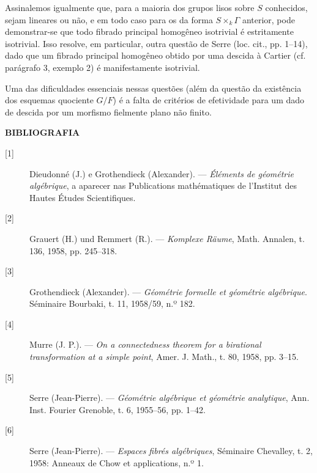 Assinalemos igualmente que, para a maioria dos grupos lisos sobre $S$ conhecidos,
sejam lineares ou não, e em todo caso para os da forma
$S\times_k\Gamma$ anterior, pode demonstrar-se que todo fibrado principal
homogêneo isotrivial é estritamente isotrivial. Isso resolve, em particular,
outra questão de Serre (loc. cit., pp. 1--14), dado que um fibrado principal
homogêneo obtido por uma descida à Cartier (cf. parágrafo 3, exemplo 2) é
manifestamente isotrivial.

 Uma das dificuldades essenciais nessas questões
(além da questão da existência dos esquemas quociente $G/F$) é a
falta de critérios de efetividade para um dado de descida por um morfismo
fielmente plano não finito.

\begin{center}
  \textbf{BIBLIOGRAFIA}
\end{center}

\begin{description}
  \item[{[1]}] Dieudonné (J.) e Grothendieck (Alexander). --- \emph{Éléments
    de géométrie algébrique}, a aparecer nas Publications
    mathématiques de l'Institut des Hautes Études Scientifiques.
  \item[{[2]}] Grauert (H.) und Remmert (R.). --- \emph{Komplexe Räume}, Math.
    Annalen, t. 136, 1958, pp. 245--318.
  \item[{[3]}] Grothendieck (Alexander). --- \emph{Géométrie formelle et
    géométrie algébrique}. Séminaire Bourbaki, t. 11, 1958/59, n.º 182.
  \item[{[4]}] Murre (J. P.). --- \emph{On a connectedness theorem for a
    birational transformation at a simple point}, Amer. J. Math., t. 80, 1958,
    pp. 3--15.
  \item[{[5]}] Serre (Jean-Pierre). --- \emph{Géométrie algébrique et géométrie
    analytique}, Ann. Inst. Fourier Grenoble, t. 6, 1955--56, pp. 1--42.
  \item[{[6]}] Serre (Jean-Pierre). --- \emph{Espaces fibrés algébriques},
    Séminaire Chevalley, t. 2, 1958: Anneaux de Chow et applications, n.º 1.
\end{description}

\par
